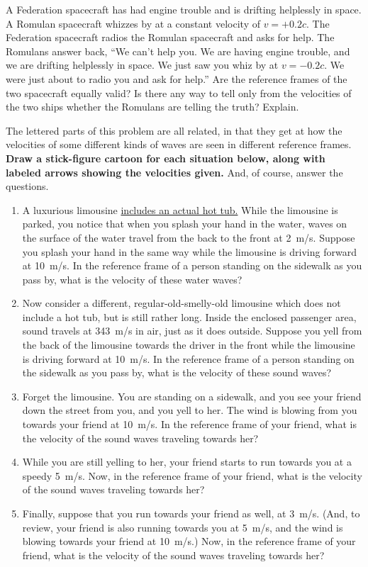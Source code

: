 \begin{Exercise}
\label{federation_and_romulans_prob}
A Federation spacecraft has had engine trouble and is drifting helplessly in space.  A Romulan spacecraft whizzes by at a constant velocity of $v=+0.2c$.  The Federation spacecraft radios the Romulan spacecraft and asks for help.  The Romulans answer back, ``We can't help you.  We are having engine trouble, and we are drifting helplessly in space.  We just saw you whiz by at $v=-0.2c$.  We were just about to radio you and ask for help.''  Are the reference frames of the two spacecraft equally valid?  Is there any way to tell only from the velocities of the two ships whether the Romulans are telling the truth?  Explain.
\end{Exercise}


\begin{Exercise}
The lettered parts of this problem are all related, in that they get at how the velocities of some different kinds of waves are seen in different reference frames.  \textbf{Draw a stick-figure cartoon for each situation below, along with labeled arrows showing the velocities given.} And, of course, answer the questions.
\begin{enumerate}[nosep,label=(\alph*)]
\item A luxurious limousine \href{https://veryfamousmagazine.com/glamorous-history-hot-tub-limo/}{includes an actual hot tub.}  
While the limousine is parked, you notice that when you splash your hand in the water, waves on the surface of the water travel from the back to the front at 2~m/s.  Suppose you splash your hand in the same way while the limousine is driving forward at 10~m/s.  In the reference frame of a person standing on the sidewalk as you pass by, what is the velocity of these water waves?
\item Now consider a different, regular-old-smelly-old limousine which does not include a hot tub, but is still rather long.  Inside the enclosed passenger area, sound travels at 343~m/s in air, just as it does outside.  Suppose you yell from the back of the limousine towards the driver in the front while the limousine is driving forward at 10~m/s.  In the reference frame of a person standing on the sidewalk as you pass by, what is the velocity of these sound waves?
\item Forget the limousine.  You are standing on a sidewalk, and you see your friend down the street from you, and you yell to her.  The wind is blowing from you towards your friend at 10~m/s.  In the reference frame of your friend, what is the velocity of the sound waves traveling towards her?
\item While you are still yelling to her, your friend starts to run towards you at a speedy 5~m/s.  Now, in the reference frame of your friend, what is the velocity of the sound waves traveling towards her?
\item Finally, suppose that you run towards your friend as well, at 3~m/s.  (And, to review, your friend is also running towards you at 5~m/s, and the wind is blowing towards your friend at 10~m/s.)  Now, in the reference frame of your friend, what is the velocity of the sound waves traveling towards her?
\end{enumerate}
\end{Exercise}
